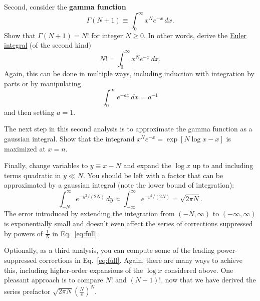 \documentclass[12 pt]{article} %
\newcommand{\Ga}{\ensuremath{\Gamma} }
\newcommand{\eq}[1]{Eq.~\ref{#1}}
\begin{document}
Second, consider the \textbf{gamma function}
\begin{equation*}
  \Ga(N + 1) \equiv \int_0^{\infty} x^N e^{-x} \, dx.
\end{equation*}
Show that $\Ga(N + 1) = N!$ for integer $N \geq 0$.
In other words, derive the \href{https://en.wikipedia.org/wiki/Euler_integral}{Euler integral} (of the second kind)
\begin{equation}
  N! = \int_0^{\infty} x^N e^{-x} \, dx.
\end{equation}
Again, this can be done in multiple ways, including induction with integration by parts or by manipulating
\begin{equation*}
  \int_0^{\infty} e^{-ax} \, dx = a^{-1}
\end{equation*}
and then setting $a = 1$.

\newpage
The next step in this second analysis is to approximate the gamma function as a gaussian integral.
Show that the integrand $x^N e^{-x} = \exp\left[N\log x - x\right]$ is maximized at $x = n$.

Finally, change variables to $y \equiv x - N$ and expand the $\log x$ up to and including terms quadratic in $y \ll N$.
You should be left with a factor that can be approximated by a gaussian integral (note the lower bound of integration):
\begin{equation*}
  \int_{-N}^{\infty} e^{-y^2 / (2N)} \, dy \approx \int_{-\infty}^{\infty} e^{-y^2 / (2N)} = \sqrt{2\pi N}.
\end{equation*}
The error introduced by extending the integration from $(-N, \infty)$ to  $(-\infty, \infty)$ is exponentially small and doesn't even affect the series of corrections suppressed by powers of $\frac{1}{N}$ in \eq{eq:full}.

Optionally, as a third analysis, you can compute some of the leading power-suppressed corrections in \eq{eq:full}.
Again, there are many ways to achieve this, including higher-order expansions of the $\log x$ considered above.
One pleasant approach is to compare $N!$ and $(N + 1)!$, now that we have derived the series prefactor $\sqrt{2\pi N} \left(\frac{N}{e}\right)^N$.
\end{document}
